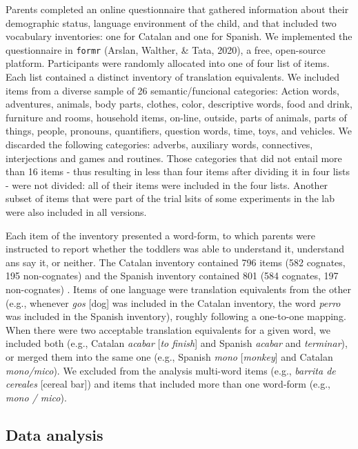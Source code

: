 \documentclass[english,man,man,floatsintext]{apa6}
\begin{document}
Parents completed an online questionnaire that gathered information about their demographic status, language environment of the child, and that included two vocabulary inventories: one for Catalan and one for Spanish. We implemented the questionnaire in \texttt{formr} (Arslan, Walther, \& Tata, 2020), a free, open-source platform. Participants were randomly allocated into one of four list of items. Each list contained a distinct inventory of translation equivalents. We included items from a diverse sample of 26 semantic/funcional categories: Action words, adventures, animals, body parts, clothes, color, descriptive words, food and drink, furniture and rooms, household items, on-line, outside, parts of animals, parts of things, people, pronouns, quantifiers, question words, time, toys, and vehicles. We discarded the following categories: adverbs, auxiliary words, connectives, interjections and games and routines. Those categories that did not entail more than 16 items - thus resulting in less than four items after dividing it in four lists - were not divided: all of their items were included in the four lists. Another subset of items that were part of the trial lsits of some experiments in the lab were also included in all versions.

Each item of the inventory presented a word-form, to which parents were instructed to report whether the toddlers was able to understand it, understand ans say it, or neither. The Catalan inventory contained 796 items (582 cognates, 195 non-cognates) and the Spanish inventory contained 801 (584 cognates, 197 non-cognates) . Items of one language were translation equivalents from the other (e.g., whenever \emph{gos} {[}dog{]} was included in the Catalan inventory, the word \emph{perro} was included in the Spanish inventory), roughly following a one-to-one mapping. When there were two acceptable translation equivalents for a given word, we included both (e.g., Catalan \emph{acabar} {[}\emph{to finish}{]} and Spanish \emph{acabar} and \emph{terminar}), or merged them into the same one (e.g., Spanish \emph{mono} {[}\emph{monkey}{]} and Catalan \emph{mono/mico}). We excluded from the analysis multi-word items (e.g., \emph{barrita de cereales} {[}cereal bar{]}) and items that included more than one word-form (e.g., \emph{mono / mico}).

\hypertarget{data-analysis}{%
\subsection{Data analysis}\label{data-analysis}}
\end{document}
